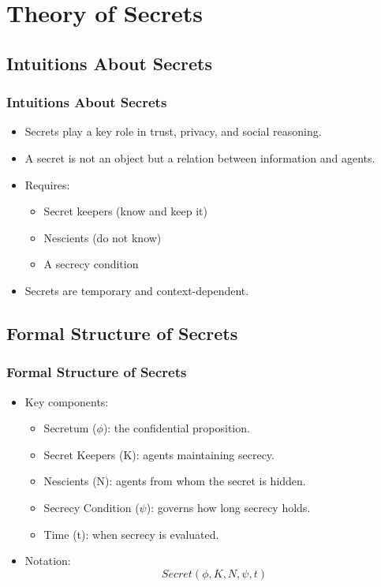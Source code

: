 \documentclass[aspectratio=169]{beamer}
\begin{document}

\section{Theory of Secrets}

\subsection{Intuitions About Secrets}
\begin{frame}
\frametitle{Intuitions About Secrets}
\begin{itemize}
    \item Secrets play a key role in trust, privacy, and social reasoning.
    \item A secret is not an object but a relation between information and agents.
    \item Requires:
    \begin{itemize}
        \item Secret keepers (know and keep it)
        \item Nescients (do not know)
        \item A secrecy condition
    \end{itemize}
    \item Secrets are temporary and context-dependent.
\end{itemize}
\end{frame}

\subsection{Formal Structure of Secrets}
\begin{frame}
\frametitle{Formal Structure of Secrets}
\begin{itemize}
    \item Key components:
    \begin{itemize}
        \item Secretum ($\phi$): the confidential proposition.
        \item Secret Keepers (K): agents maintaining secrecy.
        \item Nescients (N): agents from whom the secret is hidden.
        \item Secrecy Condition ($\psi$): governs how long secrecy holds.
        \item Time (t): when secrecy is evaluated.
    \end{itemize}
    \item Notation: 
    \[
    Secret(\phi, K, N, \psi, t)
    \]
\end{itemize}
\end{frame}
\end{document}
